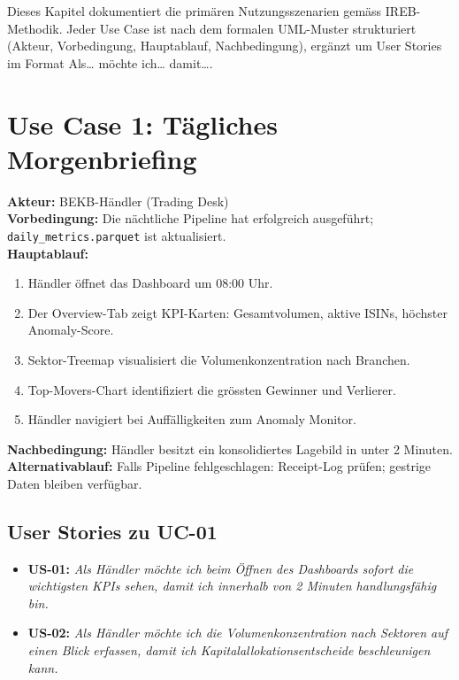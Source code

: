 \documentclass[12pt, a4paper, oneside]{report}
\newcommand{\code}[1]{\texttt{\small\textcolor{darknavy}{#1}}}
\begin{document}
Dieses Kapitel dokumentiert die prim\"aren Nutzungsszenarien gem\"ass IREB-Methodik. Jeder Use Case ist nach dem formalen UML-Muster strukturiert (Akteur, Vorbedingung, Hauptablauf, Nachbedingung), erg\"anzt um User Stories im Format \glqq Als\ldots{} m\"ochte ich\ldots{} damit\ldots\grqq.

\section{Use Case 1: T\"agliches Morgenbriefing}

\begin{usecasebox}
\textbf{Akteur:} BEKB-H\"andler (Trading Desk)\\[4pt]
\textbf{Vorbedingung:} Die n\"achtliche Pipeline hat erfolgreich ausgef\"uhrt; \code{daily\_metrics.parquet} ist aktualisiert.\\[4pt]
\textbf{Hauptablauf:}
\begin{enumerate}
  \item H\"andler \"offnet das Dashboard um 08:00 Uhr.
  \item Der Overview-Tab zeigt KPI-Karten: Gesamtvolumen, aktive ISINs, h\"ochster Anomaly-Score.
  \item Sektor-Treemap visualisiert die Volumenkonzentration nach Branchen.
  \item Top-Movers-Chart identifiziert die gr\"ossten Gewinner und Verlierer.
  \item H\"andler navigiert bei Auff\"alligkeiten zum Anomaly Monitor.
\end{enumerate}
\textbf{Nachbedingung:} H\"andler besitzt ein konsolidiertes Lagebild in unter 2 Minuten.\\[4pt]
\textbf{Alternativablauf:} Falls Pipeline fehlgeschlagen: Receipt-Log pr\"ufen; gestrige Daten bleiben verf\"ugbar.
\end{usecasebox}

\subsection{User Stories zu UC-01}

\begin{itemize}
  \item \textbf{US-01:} \textit{Als H\"andler m\"ochte ich beim \"Offnen des Dashboards sofort die wichtigsten KPIs sehen, damit ich innerhalb von 2 Minuten handlungsf\"ahig bin.}
  \item \textbf{US-02:} \textit{Als H\"andler m\"ochte ich die Volumenkonzentration nach Sektoren auf einen Blick erfassen, damit ich Kapitalallokationsentscheide beschleunigen kann.}
\end{itemize}
\end{document}
